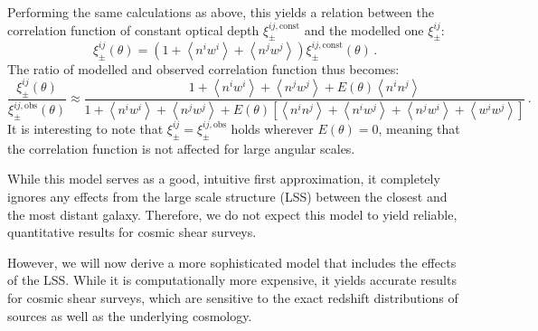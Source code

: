 \documentclass[referee]{aa} %
\renewcommand{\[}{\begin{equation}}
\renewcommand{\]}{\end{equation}}
\renewcommand{\rm}{\mathrm}
\def\la{\left<}
\def\ra{\right>}
\begin{document}
 Performing the same calculations as above, this yields a relation between the correlation function of constant optical depth $\xi_\pm^{ij,\rm{const}}$ and the modelled one $\xi_\pm^{ij}$:
\begin{equation}
\xi_\pm^{ij}(\theta) = \left(1+\la n^iw^i\ra + \la n^jw^j\ra \right)\xi_\pm^{ij,\rm{const}}(\theta)\, .
\end{equation}
The ratio of modelled and observed correlation function thus becomes: \begin{equation}
\frac{\xi^{ij}_\pm(\theta)}{\xi_\pm^{ij,\rm{obs}}(\theta)} \approx \frac{1+\la n^iw^i\ra+\la n^jw^j\ra + E(\theta)\la n^in^j\ra}{1 + \la n^iw^i\ra + \la n^jw^j\ra + E(\theta)\left[\la n^in^j\ra + \la n^iw^j\ra + \la n^j w^i\ra + \la w^iw^j\ra\right]}
\, .
\end{equation}
It is interesting to note that $\xi^{ij}_\pm = \xi_\pm^{ij,\rm{obs}}$ holds wherever $E(\theta)=0$, meaning that the correlation function is not affected for large angular scales. 

While this model serves as a good, intuitive first approximation, it completely ignores any effects from the large scale structure (LSS) between the closest and the most distant galaxy. Therefore, we do not expect this model to yield reliable, quantitative results for cosmic shear surveys.

However, we will now derive a more sophisticated model that includes the effects of the LSS. While it is computationally more expensive, it yields accurate results for cosmic shear surveys, which are sensitive to the exact redshift distributions of sources as well as the underlying cosmology.
\end{document}
